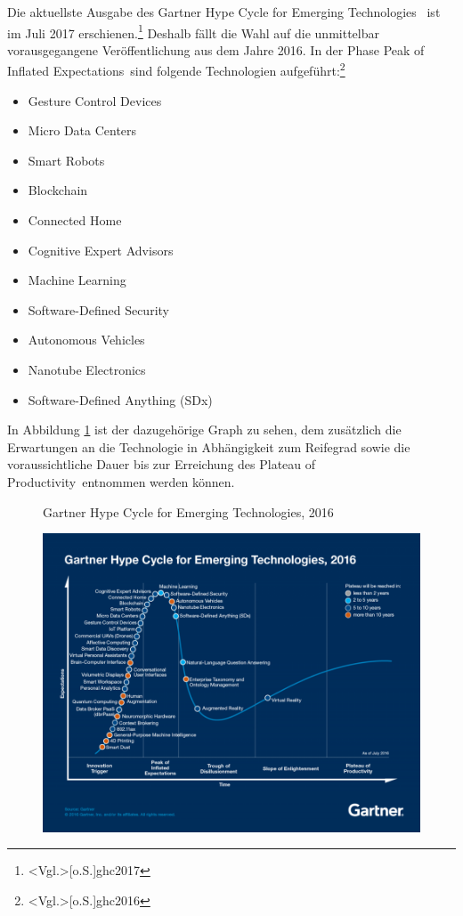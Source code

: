 Die aktuellste Ausgabe des \glqq Gartner Hype Cycle for Emerging Technologies\grqq~ ist im Juli 2017 erschienen.\footnote{\citeNP<Vgl.>[o.S.]{ghc2017}} Deshalb fällt die Wahl auf die unmittelbar vorausgegangene Veröffentlichung aus dem Jahre 2016. In der Phase \glqq Peak of Inflated Expecta\-tions\grqq~sind folgende Technologien aufgeführt:\footnote{\citeNP<Vgl.>[o.S.]{ghc2016}}

\begin{itemize}
	\item Gesture Control Devices
	\item Micro Data Centers
	\item Smart Robots
	\item Blockchain
	\item Connected Home
	\item Cognitive Expert Advisors
	\item Machine Learning
	\item Software-Defined Security
	\item Autonomous Vehicles
	\item Nanotube Electronics
	\item Software-Defined Anything (SDx)
\end{itemize}

In Abbildung \ref{fig:ghc2016} ist der dazugehörige Graph zu sehen, dem zusätzlich die Erwartungen an die Technologie in Abhängigkeit zum Reifegrad sowie die voraussichtliche Dauer bis zur Erreichung des \glqq Plateau of Productivity\grqq~entnommen werden können.

\begin{figure}[ht]
	\centering
	\caption{Gartner Hype Cycle for Emerging Technologies, 2016}
	\includegraphics[width=0.9\linewidth]{img/Hype_Cycle_2016.jpg}
	\caption*{\protect\citeNP<Quelle:>[o.S.]{ghcet2016}}
	\label{fig:ghc2016}
\end{figure}

